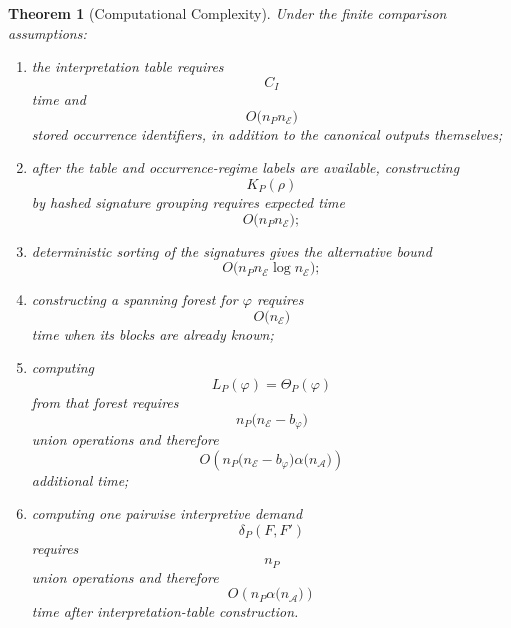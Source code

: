 \documentclass[11pt]{article}
\theoremstyle{plain}
\newtheorem{theorem}{Theorem}[section]
\theoremstyle{definition}
\theoremstyle{remark}
\begin{document}
\begin{theorem}[Computational Complexity]
  \label{ik.thm.computational-complexity}
  Under the finite comparison assumptions:
  \begin{enumerate}[label=(\alph*)]
    \item the interpretation table requires
          \[
            C_I
          \]
          time and
          \[
            O
            \bigl(
            n_P n_{\mathcal{E}}
            \bigr)
          \]
          stored occurrence identifiers,
          in addition to the canonical outputs themselves;

    \item after the table and occurrence-regime labels are available,
          constructing
          \[
            K_P(\rho)
          \]
          by hashed signature grouping requires expected time
          \[
            O
            \bigl(
            n_P n_{\mathcal{E}}
            \bigr);
          \]

    \item deterministic sorting of the signatures
          gives the alternative bound
          \[
            O
            \bigl(
            n_P n_{\mathcal{E}}
            \log n_{\mathcal{E}}
            \bigr);
          \]

    \item constructing a spanning forest
          for \(\varphi\)
          requires
          \[
            O
            \bigl(
            n_{\mathcal{E}}
            \bigr)
          \]
          time when its blocks are already known;

    \item computing
          \[
            L_P(\varphi)
            =
            \Theta_P(\varphi)
          \]
          from that forest requires
          \[
            n_P
            \bigl(
            n_{\mathcal{E}}
            -
            b_{\varphi}
            \bigr)
          \]
          union operations and therefore
          \[
            O
            \left(
            n_P
            \bigl(
              n_{\mathcal{E}}
              -
              b_{\varphi}
              \bigr)
            \alpha
            \bigl(
              n_{\mathcal{A}}
              \bigr)
            \right)
          \]
          additional time;

    \item computing one pairwise interpretive demand
          \[
            \delta_P(F,F')
          \]
          requires
          \[
            n_P
          \]
          union operations and therefore
          \[
            O
            \left(
            n_P
            \alpha
            \bigl(
              n_{\mathcal{A}}
              \bigr)
            \right)
          \]
          time after interpretation-table construction.
  \end{enumerate}
\end{theorem}
\end{document}
